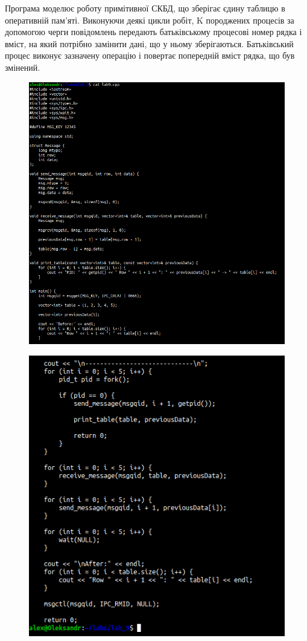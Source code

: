 \documentclass[a4paper,12pt]{article}
\begin{document}
    Програма моделює роботу примітивної СКБД, що зберігає єдину таблицю в оперативній пам'яті. Виконуючи деякі цикли
    робіт, K породжених процесів за допомогою черги повідомлень передають батьківському процесові номер рядка і вміст, на
    який потрібно замінити дані, що у ньому зберігаються. Батьківський процес виконує зазначену операцію і повертає
    попередній вміст рядка, що був змінений.
    \begin{figure}[h!]
        \begin{minipage}[h]{1\linewidth}
            \centering
            \includegraphics[width=0.8\linewidth]{Prt sc/Figure_1_1.png}  
        \end{minipage}
    \end{figure}

\newpage
    \begin{figure}[h!]
        \begin{minipage}[h]{1\linewidth}
            \centering
            \includegraphics[width=0.8\linewidth]{Prt sc/Figure_1_2.png}  
        \end{minipage}
    \end{figure}
\end{document}
